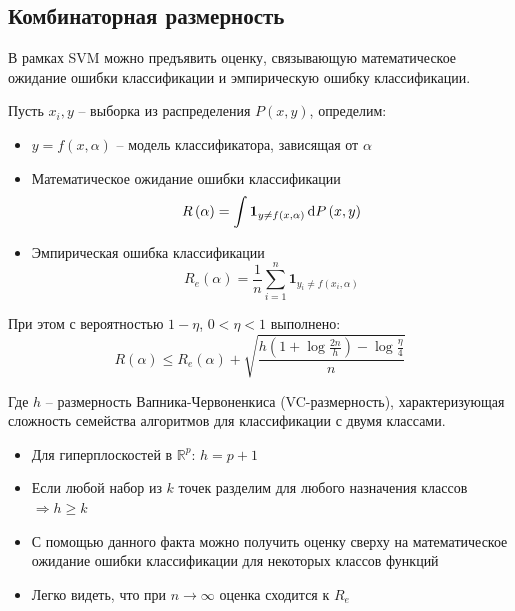 \subsection{Комбинаторная размерность}
\begin{frame}
	В рамках SVM можно предъявить оценку, связывающую математическое ожидание
ошибки классификации и эмпирическую ошибку классификации.

	Пусть $x_i,y$ -- выборка из распределения $P\left(x, y\right)$, определим:
	\begin{itemize}
		\item $y=f\left(x,\alpha\right)$ -- модель классификатора, зависящая от $\alpha$
		\item Математическое ожидание ошибки классификации
			$$R\left(\alpha\right)=\int \mathbf{1}_{y\neq f\left(x, \alpha\right)}\mathop{}\!\mathrm{d}{P\left(x,y\right)}$$
		\item Эмпирическая ошибка классификации
			$$R_e\left(\alpha\right)=\frac{1}{n}\sum_{i=1}^n \mathbf{1}_{y_i\neq f\left(x_i, \alpha\right)}$$
	\end{itemize}
\end{frame}

\begin{frame}
	При этом с вероятностью $1-\eta$, $0<\eta<1$ выполнено:
	$$	R\left(\alpha\right) \leq R_e\left(\alpha\right)+\sqrt{\frac{h\left(1+\log{\frac{2n}{h}}\right)-\log\frac{\eta}{4}}{n}}$$

	Где $h$ -- размерность Вапника-Червоненкиса (VC-размерность), характеризующая
	сложность семейства алгоритмов для классификации с двумя классами.
	\begin{itemize}
		\item Для гиперплоскостей в $\mathbb{R}^p$: $h=p+1$
		\item Если любой набор из $k$ точек разделим для любого назначения классов $\Rightarrow h\geq k$
        \item С помощью данного факта можно получить оценку сверху на математическое ожидание ошибки классификации
            для некоторых классов функций
        \item Легко видеть, что при $n\rightarrow\infty$ оценка сходится к $R_e$
	\end{itemize}
\end{frame}


